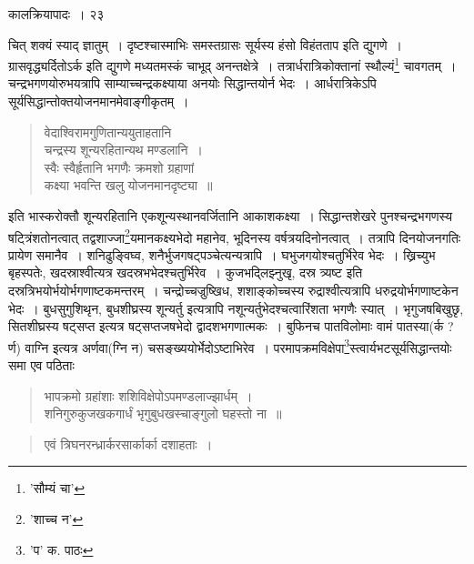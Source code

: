 \documentclass[11pt, openany]{book}
\begin{document}
{\newpage

\vspace{3cm} \hspace{4cm}कालक्रियापादः~। \hspace{4cm}२३

\vspace{0.3cm}
\noindent चित् शक्यं स्याद् ज्ञातुम्~। दृष्टश्चास्माभिः समस्तग्रासः सूर्यस्य {\qt हंसो विहंतताप} इति द्युगणे~। {\qt ग्रासवृद्ध्यर्दितोऽर्क} इति द्युगणे मध्यतमस्कं चाभूद् अनन्तक्षेत्रे~। तत्रार्धरात्रिकोक्तानां स्थौल्यं\renewcommand{\thefootnote}{१}\footnote{'सौम्यं चा'} चावगतम्~। चन्द्रभगणयोरुभयत्रापि साम्याच्चन्द्रकक्ष्याया अनयोः सिद्धान्तयोर्न भेदः~। आर्धरात्रिकेऽपि सूर्यसिद्धान्तोक्तयोजनमानमेवाङ्गीकृतम्~। 

\begin{quote}
{\qt वेदाश्विरामगुणितान्ययुताहतानि\\
चन्द्रस्य शून्यरहितान्यथ मण्डलानि~।\\
स्वैः स्वैर्हृतानि भगणैः क्रमशो ग्रहाणां\\
कक्ष्या भवन्ति खलु योजनमानदृष्ट्या~॥}
\end{quote}

\noindent इति भास्करोक्तौ शून्यरहितानि एकशून्यस्थानवर्जितानि आकाशकक्ष्या~। सिद्धान्तशेखरे पुनश्चन्द्रभगणस्य षट्त्रिंशतोनत्वात्
तद्वशाज्जा\renewcommand{\thefootnote}{२}\footnote{'शाच्च न'}यमानकक्ष्यभेदो महानेव, भूदिनस्य वर्षत्रयदिनोनत्वात्~। तत्रापि दिनयोजनगतिः प्रायेण समानैव~। शनिढुङ्विघ्व, शनैर्भुजगषट्पञ्चेत्यन्यत्रापि~। घभुजगयोश्चतुर्भिरेव भेदः~। ख्रिच्युभ बृहस्पतेः, खदस्राश्वीत्यत्र खदस्रभभेदश्चतुर्भिरेव~। कुजभद्लिझ्नुखृ, दस्र त्र्यष्ट इति दस्रत्रिभयोर्भयोर्भगणाष्टकमन्तरम्~। चन्द्रोच्चज्रुष्खिध, शशाङ्कोच्चस्य रुद्राश्वीत्यत्रापि धरुद्रयोर्भगणाष्टकेन भेदः~। बुधसुगुशिथृन, बुधशीघ्रस्य शून्यर्तु इत्यत्रापि नशून्यर्तुभेदश्चत्वारिंशता भगणैः स्यात्~। भृगुजषबिखुछृ, सितशीघ्रस्य षट्सप्त इत्यत्र षट्सप्तजषभेदो द्वादशभगणात्मकः~। बुफिनच पातविलोमाः वामं पातस्या(र्क ? र्ण)
वाग्नि इत्यत्र अर्णवा(ग्नि न) चसङ्ख्ययोर्भेदोऽष्टाभिरेव~। परमापक्रमविक्षेपा\renewcommand{\thefootnote}{३}\footnote{'प' क. पाठः}स्त्वार्यभटसूर्यसिद्धान्तयोः समा एव पठिताः\textendash

\begin{quote}
{\qt भापक्रमो ग्रहांशाः शशिविक्षेपोऽपमण्डलाज्झार्धम्~।\\
शनिगुरुकुजखकगार्धं भृगुबुधखस्चाङ्गुलो घहस्तो ना~॥}
\end{quote}

\begin{quote} 
{\qt एवं त्रिघनरन्ध्रार्करसार्कार्का दशाहताः~।}
\end{quote}

}
\end{document}
